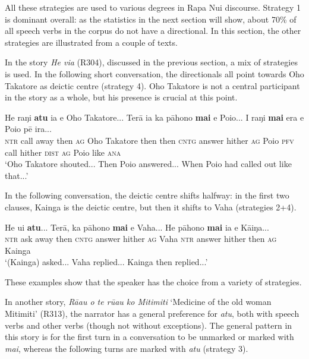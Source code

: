 All these strategies are used to various degrees in Rapa Nui discourse. Strategy 1 is dominant overall: as the statistics in the next section will show, about 70\% of all speech verbs in the corpus do not have a directional. In this section, the other strategies are illustrated from a couple of texts.

In the story \textit{He via} (R304), discussed in the previous section, a mix of strategies is used. In the following short conversation, the directionals all point towards Oho Takatore as deictic centre (strategy 4). Oho Takatore is not a central participant in the story as a whole, but his presence is crucial at this point.

\ea\label{ex:7.140}
\gll He raŋi \textbf{atu} ia e {\ꞌ}Oho Takatore... Terā ia ka pāhono \textbf{mai} e Poio... I raŋi \textbf{mai} era e Poio pē ira...\\
\textsc{ntr} call away then \textsc{ag} Oho Takatore then then \textsc{cntg} answer hither \textsc{ag} Poio \textsc{pfv} call hither \textsc{dist} \textsc{ag} Poio like \textsc{ana}\\

\glt
‘Oho Takatore shouted... Then Poio answered... When Poio had called out like that...’ \textstyleExampleref{[R304.058-063]}
\z

In the following conversation, the deictic centre shifts halfway: in the first two clauses, Kainga is the deictic centre, but then it shifts to Vaha (strategies 2+4). 

\ea\label{ex:7.141}
\gll He {\ꞌ}ui \textbf{atu}... Terā, ka pāhono \textbf{mai} e Vaha... He pāhono \textbf{mai} ia e Kāiŋa...\\
\textsc{ntr} ask away then \textsc{cntg} answer hither \textsc{ag} Vaha \textsc{ntr} answer hither then \textsc{ag} Kainga\\

\glt
‘(Kainga) asked... Vaha replied... Kainga then replied...’ \textstyleExampleref{[R304.096]} 
\z

These examples show that the speaker has the choice from a variety of strategies.

In another story, \textit{Rā{\ꞌ}au o te rū{\ꞌ}au ko Mitimiti} ‘Medicine of the old woman Mitimiti’ (R313), the narrator has a general preference for \textit{atu}, both with speech verbs and other verbs (though not without exceptions). The general pattern in this story is for the first turn in a conversation to be unmarked or marked with \textit{mai}, whereas the following turns are marked with \textit{atu} (strategy 3).

